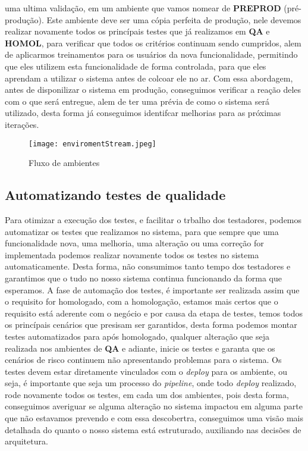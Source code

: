     uma ultima validação, em um ambiente que vamos nomear de \textbf{PREPROD}
    (pré-produção). Este ambiente deve ser uma cópia perfeita de produção, nele
    devemos realizar novamente todos os princípais testes que já realizamos em
    \textbf{QA} e \textbf{HOMOL}, para verificar que todos os critérios continuam
    sendo cumpridos, alem de aplicarmos treinamentos para os usuários da nova
    funcionalidade, permitindo que eles utilizem esta funcionalidade de forma
    controlada, para que eles aprendam a utilizar o sistema antes de colcoar ele
    no ar. Com essa abordagem, antes de disponilizar o sistema em produção,
    conseguimos verificar a reação deles com o que será entregue, alem de ter uma
    prévia de como o sistema será utilizado, desta forma já conseguimos identifcar
    melhorias para as próximas iterações. \newline

    \begin{figure}[!h]
      \centering
      \texttt{[image: enviromentStream.jpeg]}
      \caption{Fluxo de ambientes}
      \label{Imagem:1}
    \end{figure}

    \subsection{Automatizando testes de qualidade}
    Para otimizar a execução dos testes, e facilitar o trbalho dos testadores,
    podemos automatizar os testes que realizamos no sistema, para que sempre que
    uma funcionalidade nova, uma melhoria, uma alteração ou uma correção for
    implementada podemos realizar novamente todos os testes no sistema
    automaticamente. Desta forma, não consumimos tanto tempo dos testadores e
    garantimos que o tudo no nosso sistema continua funcionando da forma que
    esperamos. A fase de automação dos testes, é importante ser realizada assim
    que o requisito for homologado, com a homologação, estamos mais certos que o
    requisito está aderente com o negócio e por causa da etapa de testes, temos
    todos os princípais cenários que presisam ser garantidos, desta forma podemos
    montar testes automatizados para após homologado, qualquer alteração que seja
    realizada nos ambientes de \textbf{QA} e adiante, inicie os testes e garanta
    que os cenários de risco continuem não apresentando problemas para o sistema. \newline
    Os testes devem estar diretamente vinculados com o \textit{deploy} para os
    ambiente, ou seja, é importante que seja um processo do \textit{pipeline},
    onde todo \textit{deploy} realizado, rode novamente todos os testes, em cada
    um dos ambientes, pois desta forma, conseguimos averiguar se alguma alteração
    no sistema impactou em alguma parte que não estavamos prevendo e com essa
    descobertra, conseguimos uma visão mais detalhada do quanto o nosso sistema
    está estruturado, auxiliando nas decisões de arquitetura.

